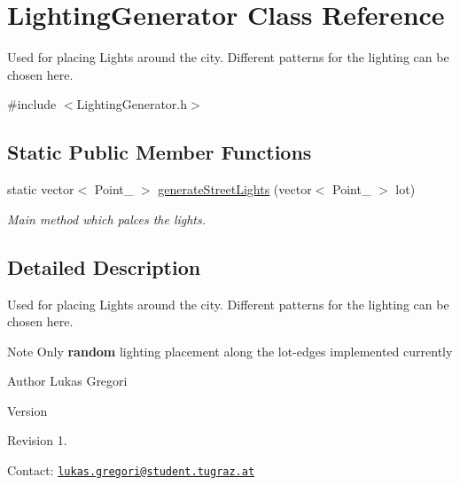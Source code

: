 \hypertarget{class_lighting_generator}{}\section{Lighting\+Generator Class Reference}
\label{class_lighting_generator}


Used for placing Lights around the city. Different patterns for the lighting can be chosen here.  




{\ttfamily \#include $<$Lighting\+Generator.\+h$>$}

\subsection*{Static Public Member Functions}
\begin{DoxyCompactItemize}
\item 
static vector$<$ Point\+\_ $>$ \hyperlink{class_lighting_generator_aeb4a2896ceab6923c747d0a30ce3543f}{generate\+Street\+Lights} (vector$<$ Point\+\_ $>$ lot)
\begin{DoxyCompactList}\small\item\em Main method which palces the lights. \end{DoxyCompactList}\end{DoxyCompactItemize}


\subsection{Detailed Description}
Used for placing Lights around the city. Different patterns for the lighting can be chosen here. 

\begin{DoxyNote}{Note}
Only {\bfseries random} lighting placement along the lot-\/edges implemented currently
\end{DoxyNote}
\begin{DoxyAuthor}{Author}
Lukas Gregori 
\end{DoxyAuthor}
\begin{DoxyVersion}{Version}

\end{DoxyVersion}
\begin{DoxyParagraph}{Revision}
1. 
\end{DoxyParagraph}


Contact\+: \href{mailto:lukas.gregori@student.tugraz.at}{\tt lukas.\+gregori@student.\+tugraz.\+at}




